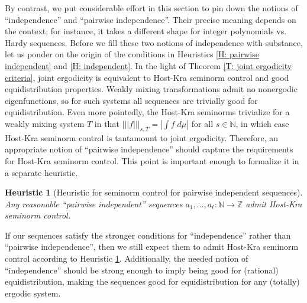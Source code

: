 \documentclass[11pt]{amsart}
\newtheorem{heuristic}[lemma]{Heuristic}
\theoremstyle{definition}
\newcommand{\N}{{\mathbb N}}
\newcommand{\Z}{{\mathbb Z}}
\newcommand{\nnorm}[1]{\lvert\!|\!| #1|\!|\!\rvert}
\newcommand{\1}{{\mathbf{1}}}
\newcommand{\abs}[1]{\mathopen{}\left| #1\mathclose{}\right|}
\begin{document}
By contrast, we put considerable effort in this section to pin down the notions of ``independence'' and ``pairwise independence''. 
Their precise meaning depends on the context; for instance, it takes a different shape for integer polynomials vs. Hardy sequences. 
Before we fill these two notions of independence with substance, let us ponder on the origin of the conditions in Heuristics \ref{H: pairwise independent} and \ref{H: independent}. In the light of Theorem \ref{T: joint ergodicity criteria}, joint ergodicity is equivalent to Host-Kra seminorm control and good equidistribution properties. Weakly mixing transformations admit no nonergodic eigenfunctions, so for such systems all sequences are trivially good for equidistribution. Even more pointedly, the Host-Kra seminorms trivialize for a weakly mixing system $T$ in that $\nnorm{f}_{s,T} = \abs{\int f\; d\mu}$ for all $s\in\N$, in which case Host-Kra seminorm control is tantamount to joint ergodicity. Therefore, an appropriate notion of ``pairwise independence'' should capture the requirements for Host-Kra seminorm control.
This point is important enough to formalize it in a separate heuristic.
\begin{heuristic}[Heuristic for seminorm control for pairwise independent sequences]\label{H: pairwise independent seminorm}
    Any reasonable ``pairwise independent'' sequences $a_1, \ldots, a_\ell:\N\to\Z$ admit Host-Kra seminorm control.    
\end{heuristic}

If our sequences satisfy the stronger conditions for ``independence'' rather than ``pairwise independence'', then we still expect them to admit Host-Kra seminorm control according to Heuristic \ref{H: pairwise independent seminorm}. Additionally, the needed notion of ``independence'' should be strong enough to imply being good for (rational) equidistribution, making the sequences good for equidistribution for any (totally) ergodic system.
\end{document}
